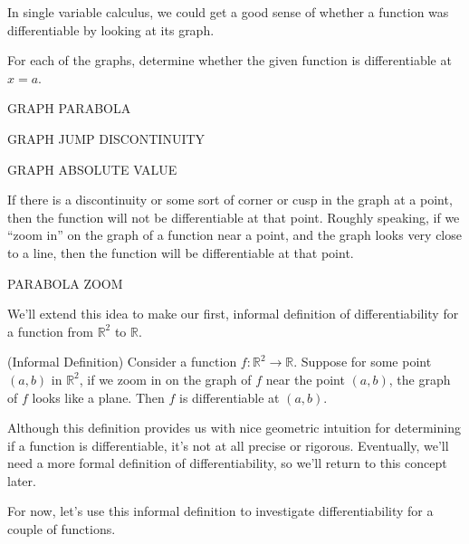 \documentclass{ximera}
\begin{document}
In single variable calculus, we could get a good sense of whether a function was differentiable by looking at its graph.

\begin{problem}
For each of the graphs, determine whether the given function is differentiable at $x=a$.

GRAPH PARABOLA
\begin{multipleChoice}
\end{multipleChoice}

GRAPH JUMP DISCONTINUITY
\begin{multipleChoice}
\end{multipleChoice}

GRAPH ABSOLUTE VALUE
\begin{multipleChoice}
\end{multipleChoice}

\end{problem}

If there is a discontinuity or some sort of corner or cusp in the graph at a point, then the function will not be differentiable at that point. Roughly speaking, if we ``zoom in'' on the graph of a function near a point, and the graph looks very close to a line, then the function will be differentiable at that point.

PARABOLA ZOOM

We'll extend this idea to make our first, informal definition of differentiability for a function from $\mathbb{R}^2$ to $\mathbb{R}$.

\begin{definition}
(Informal Definition) Consider a function $f:\mathbb{R}^2\rightarrow \mathbb{R}$. Suppose for some point $(a,b)$ in $\mathbb{R}^2$, if we zoom in on the graph of $f$ near the point $(a,b)$, the graph of $f$ looks like a plane. Then $f$ is differentiable at $(a,b)$.
\end{definition}

Although this definition provides us with nice geometric intuition for determining if a function is differentiable, it's not at all precise or rigorous. Eventually, we'll need a more formal definition of differentiability, so we'll return to this concept later.

For now, let's use this informal definition to investigate differentiability for a couple of functions.
\end{document}
